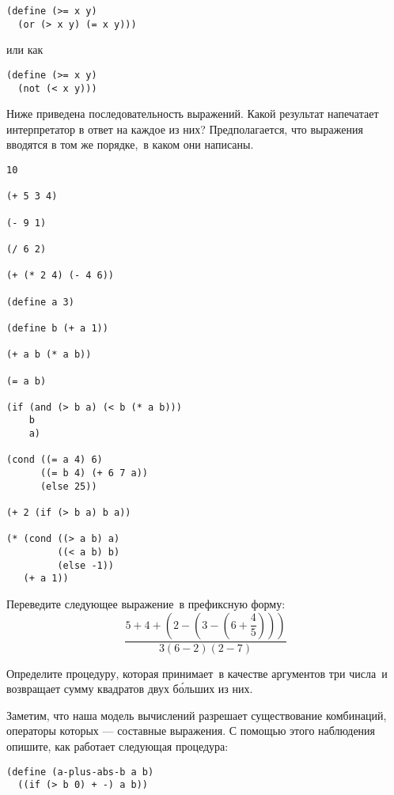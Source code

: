 \begin{Verbatim}[fontsize=\small]
(define (>= x y)
  (or (> x y) (= x y)))
\end{Verbatim}
или как

\begin{Verbatim}[fontsize=\small]
(define (>= x y)
  (not (< x y)))
\end{Verbatim}
\begin{exercise}{1.1}\label{EX1.1}%
Ниже приведена последовательность выражений. Какой
результат напечатает интерпретатор в ответ на каждое из них?
Предполагается, что  выражения вводятся в том же порядке,~в каком они написаны.

\begin{Verbatim}[fontsize=\small]
10

(+ 5 3 4)

(- 9 1)

(/ 6 2)

(+ (* 2 4) (- 4 6))

(define a 3)

(define b (+ a 1))

(+ a b (* a b))

(= a b)

(if (and (> b a) (< b (* a b)))
    b
    a)

(cond ((= a 4) 6)
      ((= b 4) (+ 6 7 a))
      (else 25))

(+ 2 (if (> b a) b a))

(* (cond ((> a b) a)
         ((< a b) b)
         (else -1))
   (+ a 1))
\end{Verbatim}
          
\end{exercise}
\begin{exercise}{1.2}\label{EX1.2}%
Переведите следующее выражение~в префиксную форму:
$$
\dfrac{5 + 4 + (2 - (3 - (6 + \dfrac{4}{5})))}
     {3(6 - 2)(2 - 7)}
$$
\end{exercise}
\begin{exercise}{1.3}\label{EX1.3}%
Определите процедуру, которая принимает~в качестве
аргументов три числа~и возвращает сумму квадратов двух б\'ольших из
них. 
\end{exercise}
\begin{exercise}{1.4}\label{EX1.4}%
Заметим, что наша модель вычислений разрешает
существование 
комбинаций, операторы которых --- составные выражения.
С помощью этого наблюдения опишите, как работает следующая
процедура: 

\begin{Verbatim}[fontsize=\small]
(define (a-plus-abs-b a b)
  ((if (> b 0) + -) a b))
\end{Verbatim}

\end{exercise}
